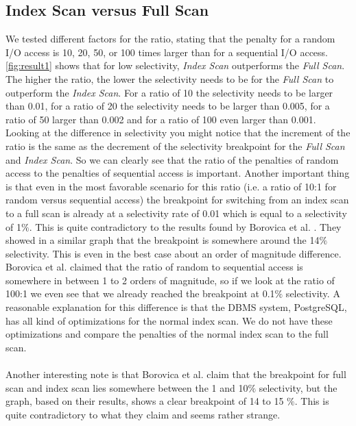 \documentclass[a4paper,11pt,twoside]{article}
\begin{document}
\subsection{Index Scan versus Full Scan}
We tested different factors for the ratio, stating that the penalty for a random I/O access is 10, 20, 50, or 100 times larger than for a sequential I/O access. \autoref{fig:result1} shows that for low selectivity, \textit{Index Scan} outperforms the \textit{Full Scan}. The higher the ratio, the lower the selectivity needs to be for the \textit{Full Scan} to outperform the \textit{Index Scan}. For a ratio of 10 the selectivity needs to be larger than 0.01, for a ratio of 20 the selectivity needs to be larger than  0.005, for a ratio of 50 larger than 0.002 and for a ratio of 100 even larger than 0.001.\\
Looking at the difference in selectivity you might notice that the increment of the ratio is the same as the decrement of the selectivity breakpoint for the  \textit{Full Scan} and \textit{Index Scan}. So we can clearly see that the ratio of the penalties of random access to the penalties of sequential access is important. Another important thing is that even in the most favorable scenario for this ratio (i.e. a ratio of 10:1 for random versus sequential access) the breakpoint for switching from an index scan to a full scan is already at a selectivity rate of 0.01 which is equal to a selectivity of 1$\%$. This is quite contradictory to the results found by Borovica et al. \cite{smoothscan}. They showed in a similar graph that the breakpoint is somewhere around the 14$\%$ selectivity. This is even in the best case about an order of magnitude difference. Borovica et al. claimed that the ratio of random to sequential access is somewhere in between 1 to 2 orders of magnitude, so if we look at the ratio of 100:1 we even see that we already reached the breakpoint at 0.1$\%$ selectivity. A reasonable explanation for this difference is that the DBMS system, PostgreSQL, has all kind of optimizations for the normal index scan. We do not have these optimizations and compare the penalties of the normal index scan to the full scan. \\
\\
Another interesting note is that Borovica et al. \cite{smoothscan} claim that the breakpoint for full scan and index scan lies somewhere between the 1 and 10$\%$ selectivity, but the graph, based on their results, shows a clear breakpoint of 14 to 15 $\%$. This is quite contradictory to what they claim and seems rather strange.
\end{document}
